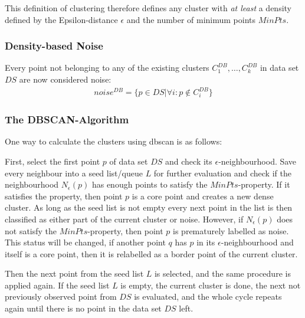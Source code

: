 This definition of clustering therefore defines any cluster with \textit{at least} a density defined by the Epsilon-distance $\epsilon$ and the number of minimum points $MinPts$.

\subsubsection*{Density-based Noise}
Every point not belonging to any of the existing clusters $C^{DB}_1, \dotsc, C^{DB}_k$ in data set $DS$ are now considered noise: 
\begin{align}
    noise^{DB} = \{p \in  DS | \forall i : p \notin C^{DB}_i\}
\end{align}

\subsubsection*{The DBSCAN-Algorithm}
One way to calculate the clusters using \gls{dbscan} is as follows:

First, select the first point $p$ of data set $DS$ and check its $\epsilon$-neighbourhood. Save every neighbour into a seed list/queue $L$ for further evaluation and check if the neighbourhood $N_{\epsilon}(p)$ has enough points to satisfy the $MinPts$-property. 
If it satisfies the property, then point $p$ is a core point and creates a new dense cluster. As long as the seed list is not empty every next point in the list is then classified as either part of the current cluster or noise.
However, if $N_{\epsilon}(p)$ does not satisfy the $MinPts$-property, then point $p$ is prematurely labelled as noise. This status will be changed, if another point $q$ has $p$ in its $\epsilon$-neighbourhood and itself is a core point, then it is relabelled as a border point of the current cluster.

Then the next point from the seed list $L$ is selected, and the same procedure is applied again.
If the seed list $L$ is empty, the current cluster is done, the next not previously observed point from $DS$ is evaluated, and the whole cycle repeats again until there is no point in the data set $DS$ left.

